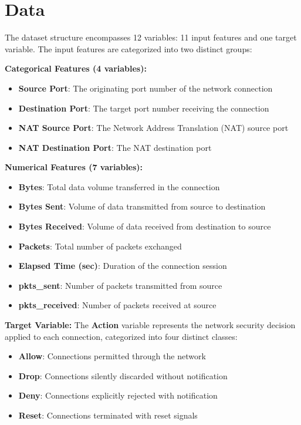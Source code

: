 \documentclass[12pt,a4paper]{article}
\begin{document}
\section{Data}

The dataset structure encompasses 12 variables: 11 input features and one target variable. The input features are categorized into two distinct groups:

\textbf{Categorical Features (4 variables):}
\begin{itemize}
    \item \textbf{Source Port}: The originating port number of the network connection
    \item \textbf{Destination Port}: The target port number receiving the connection
    \item \textbf{NAT Source Port}: The Network Address Translation (NAT) source port
    \item \textbf{NAT Destination Port}: The NAT destination port
\end{itemize}

\textbf{Numerical Features (7 variables):}
\begin{itemize}
    \item \textbf{Bytes}: Total data volume transferred in the connection
    \item \textbf{Bytes Sent}: Volume of data transmitted from source to destination
    \item \textbf{Bytes Received}: Volume of data received from destination to source
    \item \textbf{Packets}: Total number of packets exchanged
    \item \textbf{Elapsed Time (sec)}: Duration of the connection session
    \item \textbf{pkts\_sent}: Number of packets transmitted from source
    \item \textbf{pkts\_received}: Number of packets received at source
\end{itemize}

\textbf{Target Variable:}
The \textbf{Action} variable represents the network security decision applied to each connection, categorized into four distinct classes:
\begin{itemize}
    \item \textbf{Allow}: Connections permitted through the network
    \item \textbf{Drop}: Connections silently discarded without notification
    \item \textbf{Deny}: Connections explicitly rejected with notification
    \item \textbf{Reset}: Connections terminated with reset signals
\end{itemize}
\end{document}
